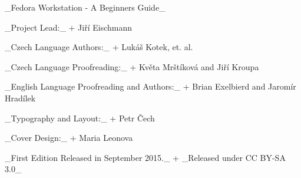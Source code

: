 _Fedora Workstation - A Beginners Guide_

_Project Lead:_ +
Jiří Eischmann

_Czech Language Authors:_ + 
Lukáš Kotek, et. al.

_Czech Language Proofreading:_ + 
Květa Mrštíková and Jiří Kroupa

_English Language Proofreading and Authors:_ +
Brian Exelbierd and Jaromír Hradílek

_Typography and Layout:_ + 
Petr Čech

_Cover Design:_ + 
Maria Leonova

_First Edition Released in September 2015._ + 
_Released under CC BY-SA 3.0_

